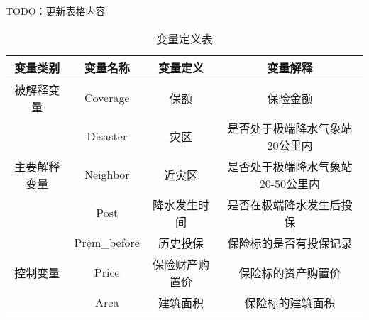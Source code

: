 TODO：更新表格内容
\begin{table}[H]
    \caption{变量定义表}\label{tab:var}
    \centering
    \begin{tabular}{@{}cccc@{}}
        \toprule
        变量类别                    & 变量名称         & 变量定义    & 变量解释                \\ \midrule
        被解释变量                   & Coverage     & 保额      & 保险金额                \\ \midrule
        \multirow{3}{*}{主要解释变量} & Disaster     & 灾区      & 是否处于极端降水气象站20公里内    \\ \cmidrule(l){2-4}
                                & Neighbor     & 近灾区     & 是否处于极端降水气象站20-50公里内 \\ \cmidrule(l){2-4}
                                & Post         & 降水发生时间  & 是否在极端降水发生后投保        \\
        \midrule
        \multirow{3}{*}{控制变量}   & Prem\_before & 历史投保    & 保险标的是否有投保记录         \\ \cmidrule(l){2-4}
                                & Price        & 保险财产购置价 & 保险标的资产购置价           \\ \cmidrule(l){2-4}
                                & Area         & 建筑面积    & 保险标的建筑面积            \\ %
        \bottomrule
    \end{tabular}
\end{table}
